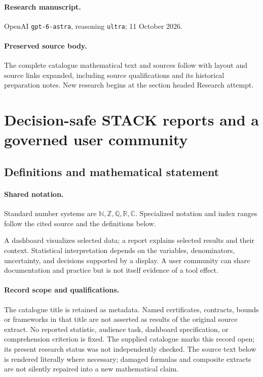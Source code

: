 \documentclass[11pt]{article}
\begin{document}
\paragraph{Research manuscript.} OpenAI \texttt{gpt-6-astra}, reasoning \texttt{ultra}; 11 October 2026.
\paragraph{Preserved source body.} The complete catalogue mathematical text and sources follow with layout and source links expanded, including source qualifications and its historical preparation notes. New research begins at the section headed Research attempt.

\section{Decision-safe STACK reports and a governed user community}\label{statement}

\subsection{Definitions and mathematical statement}

\paragraph{Shared notation.}Standard number systems are $\mathbb N,\mathbb Z,\mathbb Q,\mathbb R,\mathbb C$. Specialized notation and index ranges follow the cited source and the definitions below.


A dashboard visualizes selected data; a report explains selected results and their context. Statistical interpretation depends on the variables, denominators, uncertainty, and decisions supported by a display. A user community can share documentation and practice but is not itself evidence of a tool effect.
\paragraph{Record scope and qualifications.}
The catalogue title is retained as metadata. Named certificates, contracts, bounds or frameworks in that title are not asserted as results of the original source extract.
No reported statistic, audience task, dashboard specification, or comprehension criterion is fixed. The supplied catalogue marks this record open; its present research status was not independently checked.
The source text below is rendered literally where necessary; damaged formulas and composite extracts are not silently repaired into a new mathematical claim.
\end{document}
